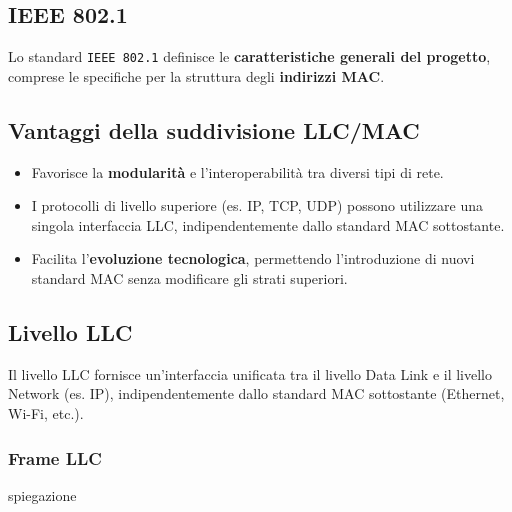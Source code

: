\subsection*{IEEE 802.1}
Lo standard \texttt{IEEE 802.1} definisce le \textbf{caratteristiche generali del progetto}, comprese le specifiche per la struttura degli \textbf{indirizzi MAC}.



\subsection*{Vantaggi della suddivisione LLC/MAC}
\begin{itemize}
    \item Favorisce la \textbf{modularità} e l'interoperabilità tra diversi tipi di rete.
    \item I protocolli di livello superiore (es. IP, TCP, UDP) possono utilizzare una singola interfaccia LLC, indipendentemente dallo standard MAC sottostante.
    \item Facilita l'\textbf{evoluzione tecnologica}, permettendo l'introduzione di nuovi standard MAC senza modificare gli strati superiori.
\end{itemize}

\subsection{Livello LLC} Il livello LLC fornisce un'interfaccia unificata tra il livello Data Link e il livello Network (es. IP), indipendentemente dallo standard MAC sottostante (Ethernet, Wi-Fi, etc.).

\subsubsection{Frame LLC}
spiegazione

